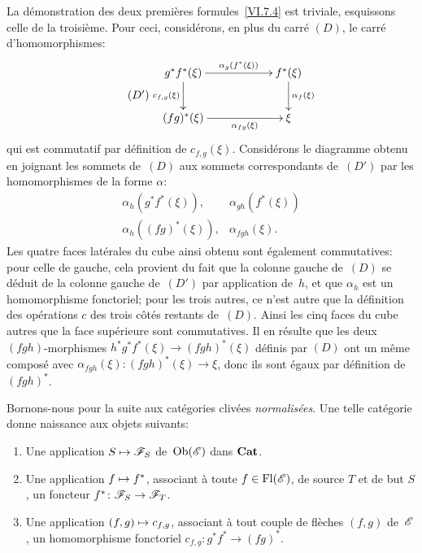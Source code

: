 \enlargethispage{.5cm}
La d\'emonstration des deux premi\`eres formules~\ref{VI.7.4} est
triviale, esquissons celle de la troisi\`eme. Pour ceci,
consid\'erons, en plus du carr\'e $(D)$, le carr\'e
d'homomorphismes:
\begin{equation*}
\label{eq:VI.7.D'} \tag{$D'$}
\begin{split}
\xymatrix@C=2cm{{g^*f^*(\xi)}\ar[r]^-{\alpha_g(f^*(\xi))}\ar[d]_{c_{f,g}(\xi)}&{f^*(\xi)}\ar[d]^{\alpha_f(\xi)}\\{(fg)^*(\xi)}\ar[r]_-{\alpha_{fg}(\xi)}&{\xi}}
\end{split}
\end{equation*}
qui
est commutatif par d\'efinition de
$c_{f,g}(\xi)$. Consid\'erons le diagramme obtenu en joignant les
sommets de~$(D)$ aux sommets correspondants de~$(D')$ par les
homomorphismes de la forme $\alpha$:
$$
\begin{array}{ll}
\alpha_h(g^*f^*(\xi)),&\alpha_{gh}(f^*(\xi))\\
\alpha_h((fg)^*(\xi)),&\alpha_{fgh}(\xi).
\end{array}
$$
Les quatre faces lat\'erales du cube ainsi obtenu sont \'egalement
commutatives: pour celle de gauche, cela provient du fait que la
colonne gauche de~$(D)$ se d\'eduit de la colonne gauche de~$(D')$
par application de~$h$, et que $\alpha_h$ est un homomorphisme
fonctoriel; pour les trois autres, ce n'est autre que la
d\'efinition des op\'erations $c$ des trois c\^ot\'es restants
de~$(D)$. Ainsi les cinq faces du cube autres que la face
sup\'erieure sont commutatives. Il en r\'esulte que les deux
$(fgh)$-morphismes $h^*g^*f^*(\xi)\to(fgh)^*(\xi)$ d\'efinis par
$(D)$ ont un m\^eme compos\'e avec $\alpha_{fgh}(\xi)\colon
(fgh)^*(\xi)\to\xi$, donc ils sont \'egaux par d\'efinition de
$(fgh)^*$.

Bornons-nous pour la suite aux cat\'egories cliv\'ees
\emph{normalisées}. Une telle cat\'egorie donne naissance aux
objets suivants:
\begin{enumerate}
\item[a)] Une application $S\mto \cal{F}_S$ de~$\Ob(\cal{E})$ dans
$\mathbf{Cat}$.
\item[b)] Une application $f\mto f^*$, associant \`a toute
$f\in\Fl(\cal{E})$, de source $T$ et de but $S$,
un
foncteur $f^*\colon \cal{F}_S\to\cal{F}_T$.
\item[c)] Une application $(f,g)\mto c_{f,g}$, associant \`a tout
couple de fl\`eches $(f,g)$ de~$\cal{E}$, un homomorphisme
fonctoriel $c_{f,g}\colon g^*f^*\to (fg)^*$.
\end{enumerate}

